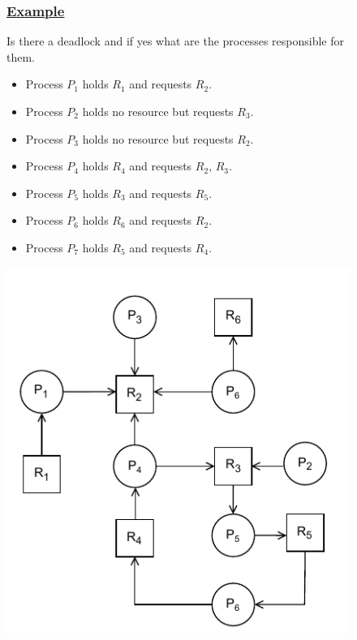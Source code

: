 \vspace{0.5cm}
\begin{figure}[h!]
    \begin{minipage}{0.6\textwidth}
        \subsubsection*{\underline{Example}}
        Is there a deadlock and if yes what are the processes responsible for them.
        \begin{itemize}
            \item Process \(P_1\) holds \(R_1\) and requests \(R_2\).
            \item Process \(P_2\) holds no resource but requests \(R_3\).
            \item Process \(P_3\) holds no resource but requests \(R_2\).
            \item Process \(P_4\) holds \(R_4\) and requests \(R_2\), \(R_3\).
            \item Process \(P_5\) holds \(R_3\) and requests \(R_5\).
            \item Process \(P_6\) holds \(R_6\) and requests \(R_2\).
            \item Process \(P_7\) holds \(R_5\) and requests \(R_4\).
        \end{itemize}
    \end{minipage}%
    \begin{minipage}{0.4\textwidth}
        \centering
        \includegraphics[width=\linewidth]{Chapters/DFS/ex1.1.drawio.pdf}
    \end{minipage}
\end{figure}


